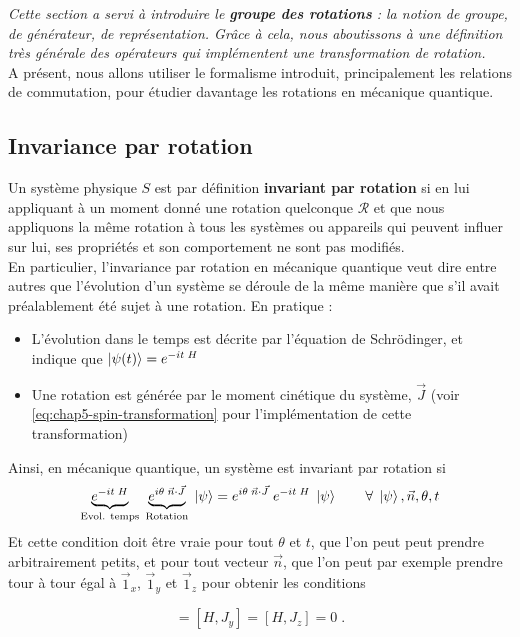 \documentclass[../notesdecours.tex]{subfiles}
\begin{document}
\begin{leftbar}
    \textit{Cette section a servi à introduire le \textbf{groupe des rotations} : la notion de groupe, de générateur, de représentation. Grâce à cela, nous aboutissons à une définition très générale des opérateurs qui implémentent une transformation de rotation.} \\

    A présent, nous allons utiliser le formalisme introduit, principalement les relations de commutation, pour étudier davantage les rotations en mécanique quantique.
\end{leftbar}
\subsection{Invariance par rotation}
Un système physique $S$ est par définition \textbf{invariant par rotation} si en lui appliquant à un moment donné une rotation quelconque $\mathcal{R}$ et que nous appliquons la même rotation à tous les systèmes ou appareils qui peuvent influer sur lui, ses propriétés et son comportement ne sont pas modifiés. \\

En particulier, l'invariance par rotation en mécanique quantique veut dire entre autres que l'évolution d'un système se déroule de la même manière que s'il avait préalablement été sujet à une rotation. En pratique :
\begin{itemize}
    \item L'évolution dans le temps est décrite par l'équation de Schrödinger, et indique que $\ket{\psi(t)} = e^{-it \; H}$
    \item Une rotation est générée par le moment cinétique du système, $\vec J$ (voir \eqref{eq:chap5-spin-transformation} pour l'implémentation de cette transformation)
\end{itemize}

Ainsi, en mécanique quantique, un système est invariant par rotation si 
$$
\underbrace{e^{-it\; H}}_{\text{Evol. temps}} \; 
\underbrace{e^{i\theta \; \vec n\cdot \vec J}}_{\text{Rotation}} \; 
\ket \psi = 
e^{i\theta \; \vec n\cdot \vec J}\; 
e^{-it\; H} \; 
 \ket \psi 
 \qquad \forall\;  \ket \psi , \vec n, \theta, t
$$
Et cette condition doit être vraie pour tout $\theta$ et $t$, que l'on peut peut prendre arbitrairement petits, et pour tout vecteur $\vec n$, que l'on peut par exemple prendre tour à tour égal à $\vec 1_x$, $\vec 1_y$ et $\vec 1_z$ pour obtenir les conditions 

\begin{equation}
    [H, J_x] = [H, J_y] = [H, J_z] = 0 \; .
\end{equation}
\end{document}

